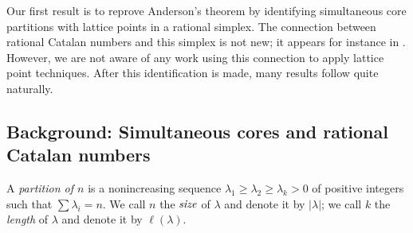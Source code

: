 \documentclass{amsart}[12pt]
\theoremstyle{definition}
\begin{document}
Our first result is to reprove Anderson's theorem by identifying simultaneous core partitions with lattice points in a rational simplex.  The connection between rational Catalan numbers and this simplex is not new; it appears for instance in \cite{LS, GMV}.    However, we are not aware of any work using this connection to apply lattice point techniques.  After this identification is made, many results follow quite naturally.
  
\subsection{Background: Simultaneous cores and rational Catalan numbers}
A \emph{partition of $n$} is a nonincreasing sequence $\lambda_1\geq \lambda_2\geq
\lambda_{k}> 0$ of positive integers such that $\sum \lambda_i=n$. We
call $n$ the $\emph{size}$ of $\lambda$ and denote it by $|\lambda|$; we call
$k$ the \emph{length} of $\lambda$ and denote it by $\ell(\lambda)$.
\end{document}
